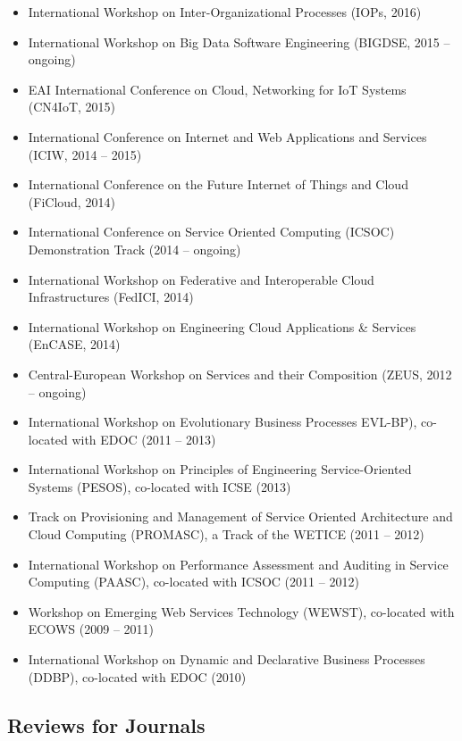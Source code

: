 \documentclass[paper=letter,fontsize=11pt]{scrartcl} %
\begin{document}
\begin{itemize}
	\item International Workshop on Inter-Organizational Processes (IOPs, 2016)
    \item  International Workshop on Big Data Software Engineering (BIGDSE, 2015 -- ongoing)
  \item EAI International Conference on Cloud, Networking for IoT Systems (CN4IoT, 2015)
  \item International Conference on Internet and Web Applications and Services (ICIW, 2014 -- 2015)
  \item International Conference on the Future Internet of Things and Cloud (FiCloud, 2014)
    \item International Conference on Service Oriented Computing (ICSOC) Demonstration Track (2014 -- ongoing)
    \item International Workshop on Federative and Interoperable Cloud Infrastructures (FedICI, 2014)
    \item International Workshop on Engineering Cloud Applications \& Services (EnCASE, 2014)
  \item Central-European Workshop on Services and their Composition (ZEUS, 2012 -- ongoing)
  \item International Workshop on Evolutionary Business Processes EVL-BP), co-located with EDOC (2011 -- 2013)
  \item International Workshop on Principles of Engineering Service-Oriented Systems (PESOS), co-located with ICSE (2013)
  \item Track on Provisioning and Management of Service Oriented Architecture and Cloud Computing (PROMASC), a Track of the WETICE (2011 -- 2012)
  \item International Workshop on Performance Assessment and Auditing in Service Computing (PAASC), co-located with ICSOC (2011 -- 2012)
  \item Workshop on Emerging Web Services Technology (WEWST), co-located
  with ECOWS (2009 -- 2011)
  \item International Workshop on Dynamic and Declarative Business
  Processes (DDBP), co-located with EDOC (2010)
\end{itemize}

\subsection*{Reviews for Journals}
\end{document}

